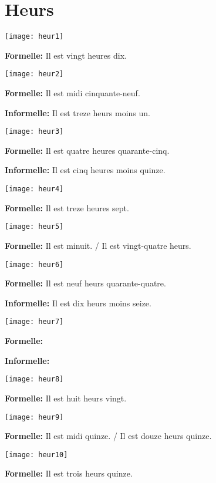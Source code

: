 \section{Heurs}

\begin{center}
    \texttt{[image: heur1]}
\end{center}

\textbf{Formelle:} Il est vingt heures dix.

\begin{center}
\texttt{[image: heur2]}
\end{center}

\textbf{Formelle:} Il est midi cinquante-neuf.

\textbf{Informelle:} Il est treze heurs moins un.

\begin{center}
    \texttt{[image: heur3]}
\end{center}

\textbf{Formelle:} Il est quatre heures quarante-cinq.

\textbf{Informelle:} Il est cinq heures moins quinze.

\begin{center}
    \texttt{[image: heur4]}
\end{center}

\textbf{Formelle:} Il est treze heures sept.

\begin{center}
    \texttt{[image: heur5]}
\end{center}

\textbf{Formelle:} Il est minuit. / Il est vingt-quatre heurs.

\begin{center}
    \texttt{[image: heur6]}
\end{center}

\textbf{Formelle:} Il est neuf heurs quarante-quatre.

\textbf{Informelle:} Il est dix heurs moins seize.

\begin{center}
    \texttt{[image: heur7]}
\end{center}

\textbf{Formelle:} 

\textbf{Informelle:}

\begin{center}
    \texttt{[image: heur8]}
\end{center}

\textbf{Formelle:} Il est huit heurs vingt.

\begin{center}
    \texttt{[image: heur9]}
\end{center}

\textbf{Formelle:} Il est midi quinze. / Il est douze heurs quinze. 

\begin{center}
    \texttt{[image: heur10]}
\end{center}

\textbf{Formelle:} Il est trois heurs quinze.